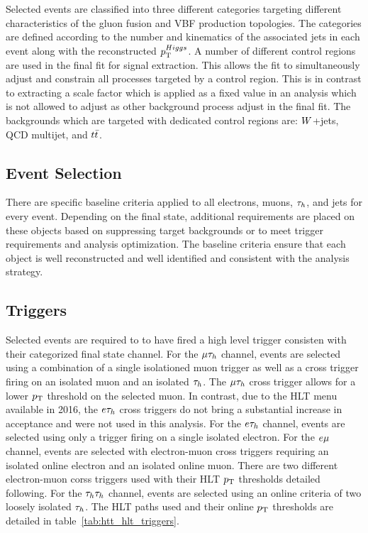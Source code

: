 Selected events are classified into three different categories targeting different characteristics
of the gluon fusion and VBF production topologies. The categories are defined according to the
number and kinematics of the associated jets in each event along with the reconstructed $p_\mathrm{T}^{Higgs}$.
A number of different control regions are used in the final fit for signal extraction. This allows
the fit to simultaneously adjust and constrain all processes targeted by a control region. This is in
contrast to extracting a scale factor which is applied as a fixed value in an analysis which is not
allowed to adjust as other background process adjust in the final fit. The backgrounds which are
targeted with dedicated control regions are: $W$+jets, QCD multijet, and $t\bar{t}$.



\subsection{Event Selection}

There are specific baseline criteria applied to all electrons, muons, $\tau_{h}$, and jets for every
event. Depending on the final state, additional requirements are placed on these objects based
on suppressing target backgrounds or to meet trigger requirements and analysis optimization. The baseline criteria ensure
that each object is well reconstructed and well identified and consistent with the analysis
strategy. 

\subsection{Triggers}
\label{sec:htt_triggers}
Selected events are required to to have fired a high level trigger consisten with their categorized final
state channel. For the $\mu\tau_{h}$ channel, events are selected using a combination
of a single isolationed muon trigger as well as a cross trigger firing on an isolated muon and
an isolated $\tau_{h}$. The $\mu\tau_{h}$ cross trigger allows for a lower $p_\mathrm{T}$ threshold
on the selected muon. In contrast, due to the HLT menu available in 2016, the $e\tau_{h}$ cross triggers
do not bring a substantial increase in acceptance and were not used in this analysis.
For the $e\tau_{h}$ channel, events are selected using only a trigger firing on a 
single isolated electron. For the $e\mu$ channel, events are selected with electron-muon cross
triggers requiring an isolated online electron and an isolated online muon. There are two 
different electron-muon corss triggers used with their HLT $p_\mathrm{T}$ thresholds detailed following.
For the $\tau_{h}\tau_{h}$ channel, events are selected using an online criteria of two loosely isolated $\tau_{h}$. 
The HLT paths used and their online $p_\mathrm{T}$ thresholds are detailed in table~\ref{tab:htt_hlt_triggers}.

